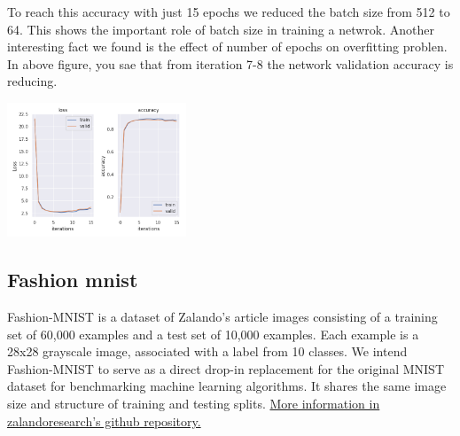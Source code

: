 \documentclass[10pt]{SelfArx} %
\begin{document}
To reach this accuracy with just 15 epochs we reduced the batch size from 512 to 64. This shows the important role of batch size in training a netwrok. Another interesting fact we found is the effect of number of epochs on overfitting problen. In above figure, you sae that from iteration 7-8 the network validation accuracy is reducing.

\begin{center}
	\includegraphics[width=\linewidth,height=4cm]{img/mnist-plots2}
	\label{fmnist2}
\end{center}


\subsection{Fashion mnist}
Fashion-MNIST is a dataset of Zalando's article images consisting of a training set of 60,000 examples and a test set of 10,000 examples. Each example is a 28x28 grayscale image, associated with a label from 10 classes. We intend Fashion-MNIST to serve as a direct drop-in replacement for the original MNIST dataset for benchmarking machine learning algorithms. It shares the same image size and structure of training and testing splits. \href{https://github.com/zalandoresearch/fashion-mnist}{More information in zalandoresearch's github repository.}
\end{document}
